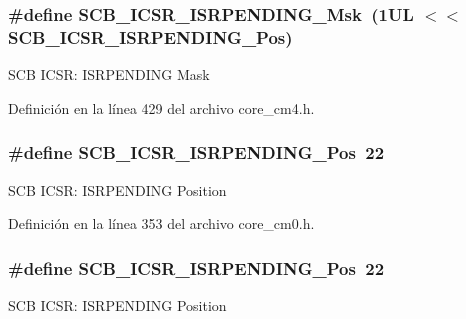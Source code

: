 \subsubsection[{\texorpdfstring{S\+C\+B\+\_\+\+I\+C\+S\+R\+\_\+\+I\+S\+R\+P\+E\+N\+D\+I\+N\+G\+\_\+\+Msk}{SCB_ICSR_ISRPENDING_Msk}}]{\setlength{\rightskip}{0pt plus 5cm}\#define S\+C\+B\+\_\+\+I\+C\+S\+R\+\_\+\+I\+S\+R\+P\+E\+N\+D\+I\+N\+G\+\_\+\+Msk~(1\+U\+L $<$$<$ S\+C\+B\+\_\+\+I\+C\+S\+R\+\_\+\+I\+S\+R\+P\+E\+N\+D\+I\+N\+G\+\_\+\+Pos)}\hypertarget{group___c_m_s_i_s___s_c_b_ga056d74fd538e5d36d3be1f28d399c877}{}\label{group___c_m_s_i_s___s_c_b_ga056d74fd538e5d36d3be1f28d399c877}
S\+CB I\+C\+SR\+: I\+S\+R\+P\+E\+N\+D\+I\+NG Mask 

Definición en la línea 429 del archivo core\+\_\+cm4.\+h.

\subsubsection[{\texorpdfstring{S\+C\+B\+\_\+\+I\+C\+S\+R\+\_\+\+I\+S\+R\+P\+E\+N\+D\+I\+N\+G\+\_\+\+Pos}{SCB_ICSR_ISRPENDING_Pos}}]{\setlength{\rightskip}{0pt plus 5cm}\#define S\+C\+B\+\_\+\+I\+C\+S\+R\+\_\+\+I\+S\+R\+P\+E\+N\+D\+I\+N\+G\+\_\+\+Pos~22}\hypertarget{group___c_m_s_i_s___s_c_b_ga10749d92b9b744094b845c2eb46d4319}{}\label{group___c_m_s_i_s___s_c_b_ga10749d92b9b744094b845c2eb46d4319}
S\+CB I\+C\+SR\+: I\+S\+R\+P\+E\+N\+D\+I\+NG Position 

Definición en la línea 353 del archivo core\+\_\+cm0.\+h.

\subsubsection[{\texorpdfstring{S\+C\+B\+\_\+\+I\+C\+S\+R\+\_\+\+I\+S\+R\+P\+E\+N\+D\+I\+N\+G\+\_\+\+Pos}{SCB_ICSR_ISRPENDING_Pos}}]{\setlength{\rightskip}{0pt plus 5cm}\#define S\+C\+B\+\_\+\+I\+C\+S\+R\+\_\+\+I\+S\+R\+P\+E\+N\+D\+I\+N\+G\+\_\+\+Pos~22}\hypertarget{group___c_m_s_i_s___s_c_b_ga10749d92b9b744094b845c2eb46d4319}{}\label{group___c_m_s_i_s___s_c_b_ga10749d92b9b744094b845c2eb46d4319}
S\+CB I\+C\+SR\+: I\+S\+R\+P\+E\+N\+D\+I\+NG Position 

